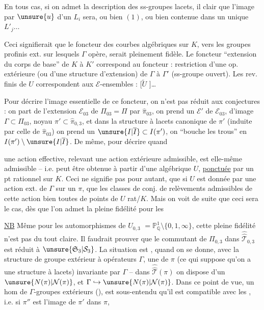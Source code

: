 En tous cas, si on admet la description des
ss-groupes lacets, il  clair que l'image par
$\unsure{u}$ d'un $L_i$ sera, ou bien $(1)$, ou bien contenue
dans un unique $L'_j\ldots$

Ceci signifierait que le foncteur des courbes
algébriques sur $K$, vers les groupes profinis ext.
sur lesquels $\Gamma$ opère, serait pleinement fidèle.
Le foncteur ``extension du corps de base'' de
$K$ à $K'$ correspond au foncteur : restriction
d'une op. extérieure (ou d'une structure
d'extension) de $\Gamma$ à $\Gamma'$ (ss-groupe ouvert).
Les rev.  finis de $U$ correspondent aux
$\mathcal E$-ensembles : [$\widetilde U$ ]\ldots

Pour décrire l'image essentielle de ce
foncteur, on n'est pas réduit aux conjectures :
on part de l'extension  $\mathcal E_{03}$ de $\Pi_{03}=\Pi$
par $\widehat{\pi}_{03}$, on prend un   $\mathcal E'$
de $\mathcal E_{03}$, d'image $\Gamma\subset\Pi_{03}$, noyau
$\pi'\subset\widehat{\pi}_{0,3}$, et dans la structure à lacets
canonique de $\pi'$ (induite par celle de $\widehat{\pi}_{03}$)
on prend un $\unsure{I|\overline I}\subset I(\pi')$,  on ``bouche les trous''
en $I(\pi')\setminus\unsure{I|\overline I}$. De même, pour décrire quand

une action effective, relevant une action extérieure
admissible, est elle-même admissible -- 
i.e. peut être obtenue à partir d'une \uline{}
algébrique $U$, \uline{ponctuée} par un pt rationnel sur $K$.
Ceci ne signifie pas pour autant, que si
$U$ est donnée par une action ext. de $\Gamma$ sur un $\pi$,
que les classes de conj. de relèvements admissibles
de cette action  bien toutes de
points de $U$ rat/$K$. Mais on voit de suite que
ceci sera le cas, dès que l'on admet la
pleine fidélité pour les \uline{}

\uline{NB} Même pour les automorphismes de $U_{0,3}$
$=\mathbb P^1_{\mathbb Q}\setminus\{0,1,\infty\}$, cette pleine fidélité n'est pas
du tout claire. Il faudrait prouver que 
le commutant de $\Pi_{0,3}$ dans $\widehat{\widehat{\mathcal T}}_{0,3}$ est réduit
à $\unsure{\mathfrak S_3|\mathcal S_3}$. La situation est ,
quand on se donne, avec la structure de
groupe  extérieur à opérateurs $\Gamma$, une 
de $\pi$ (ce qui suppose qu'on a 
une structure à lacets) invariante par  $\Gamma$
--  dans $\widehat{\widehat{\mathcal T}}(\pi)$ on dispose d'un $\unsure{N(\pi)|\mathcal N(\pi)}$,
et $\Gamma\hookrightarrow\unsure{N(\pi)|\mathcal N(\pi)}$. Dans ce point de vue,  un
hom  de $\Gamma$-groupes extérieurs (),
 est sous-entendu qu'il est compatible avec
les , i.e. si $\pi''$ est l'image de $\pi'$ dans $\pi$,

